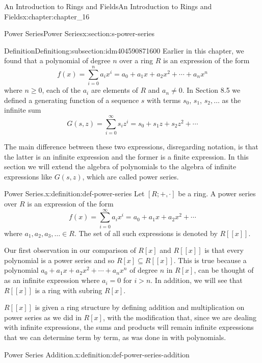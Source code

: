 \documentclass[twoside,10pt,]{book}
\numberwithin{equation}{section}
\begin{document}
\begin{chapterptx}{An Introduction to Rings and Fields}{}{An Introduction to Rings and Fields}{}{}{x:chapter:chapter_16}
\begin{sectionptx}{Power Series}{}{Power Series}{}{}{x:section:s-power-series}
\typeout{************************************************}
%
\begin{subsectionptx}{Definition}{}{Definition}{}{}{g:subsection:idm404590871600}
Earlier in this chapter, we found that a polynomial of degree \(n\) over a ring \(R\)  is an expression of the form%
\begin{equation*}
f(x)=\sum_{i=0}^n a_i x^i=a_0 + a_1 x+a_2 x^2+ \cdots +a_n x^n
\end{equation*}
where  \(n\geq 0\), each of the \(a_i\) are elements of \(R\) and \(a_n\neq 0\). In Section 8.5 we defined a generating function of a sequence \(s\) with terms \(s_0\), \(s_1\), \(s_2, \ldots\)  as the infinite sum%
\begin{equation*}
G(s,z)= \sum_{i=0}^{\infty } s_i z^i=s_0 + s_1 z+s_2 z^2+ \cdots
\end{equation*}
%
\par
The main difference between these two expressions, disregarding notation, is that the latter is an infinite expression and the former is a finite expression. In this section we will extend the algebra of polynomials to the algebra of infinite expressions like \(G(s, z)\),  which are called power series.%
\begin{definition}{Power Series.}{x:definition:def-power-series}%
%
\label{g:notation:idm404590864592}%
Let \([R; +,\cdot ]\) be a ring. A power series over \(R\) is an expression of the form%
\begin{equation*}
f(x)=\sum_{i=0}^{\infty } a_i x^i=a_0 + a_1 x+a_2 x^2+ \cdots
\end{equation*}
where \(a_1, a_2, a_3,\ldots \in  R\).  The set of all such expressions is denoted by \(R[[x]]\).%
\end{definition}
Our first observation in our comparison of \(R[x]\) and \(R[[x]]\) is that every polynomial is a power series and so \(R[x]\subseteq R[[x]]\). This is true because a polynomial \(a_0 + a_1 x+a_2 x^2+ \cdots +a_n x^n\) of degree \(n\) in \(R[x]\), can be thought of as an infinite expression where \(a_i=0\) for \(i > n\).  In addition, we will see that \(R[[x]]\) is a ring with subring \(R[x]\).%
\par
\(R[[x]]\) is given a ring structure by defining addition and multiplication on power series as we did in \(R[x]\), with the modification that, since we are dealing with infinite expressions, the sums and products will remain infinite expressions that we can determine term by term, as was done in with polynomials.%
\begin{definition}{Power Series Addition.}{x:definition:def-power-series-addition}%

\end{definition}
\end{subsectionptx}
\end{sectionptx}
\end{chapterptx}
\end{document}
